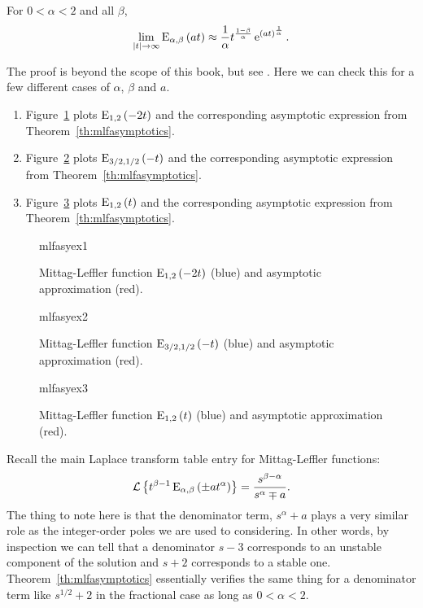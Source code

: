 \begin{theorem}
  For $0 < \alpha < 2$ and all $\beta$, 
  \begin{equation*}
    \lim_{\left| t \right| \rightarrow \infty} \operatorname{E}_{\alpha,\beta} \left( a t \right) \approx \frac{1}{\alpha} t^{\frac{1-\beta}{\alpha}}\operatorname{e}^{\left( a t \right)^\frac{1}{\alpha}}.
  \end{equation*}
  \label{th:mlfasymptotics}
\end{theorem}

The proof is beyond the scope of this book, but see \cite{fraccontrol,mlfbook}. Here we can check this for a few different cases of $\alpha$, $\beta$ and $a$.

\begin{example}
  \begin{enumerate}
    \item Figure~\ref{fig:mlfasyex1} plots $\operatorname{E}_{1,2}\left(-2 t \right)$ and the corresponding asymptotic expression from Theorem~\ref{th:mlfasymptotics}. 
    \item Figure~\ref{fig:mlfasyex2} plots $\operatorname{E}_{3/2,1/2}\left(-t \right)$ and the corresponding asymptotic expression from Theorem~\ref{th:mlfasymptotics}. 
    \item Figure~\ref{fig:mlfasyex3} plots $\operatorname{E}_{1,2}\left(t \right)$ and the corresponding asymptotic expression from Theorem~\ref{th:mlfasymptotics}. 
  \end{enumerate} 
\end{example}

\begin{figure}  
  \centering
  {mlfasyex1}
  \caption{Mittag-Leffler function $\operatorname{E}_{1,2}\left(-2 t\right)$ (blue) and asymptotic approximation (red).}
  \label{fig:mlfasyex1}
\end{figure}

\begin{figure}  
  \centering
  {mlfasyex2}
  \caption{Mittag-Leffler function $\operatorname{E}_{3/2,1/2}\left(-t\right)$ (blue) and asymptotic approximation (red).}
  \label{fig:mlfasyex2}
\end{figure}

\begin{figure}  
  \centering
  {mlfasyex3}
  \caption{Mittag-Leffler function $\operatorname{E}_{1,2}\left(t\right)$ (blue) and asymptotic approximation (red).}
  \label{fig:mlfasyex3}
\end{figure}

Recall the main Laplace transform table entry for Mittag-Leffler functions:
\begin{equation*}
  \mathcal L \left\{ t^{\beta - 1} \operatorname{E}_{\alpha,\beta} \left( \pm a t^\alpha \right) \right\} = \frac{s^{\beta-\alpha}}{s^\alpha \mp a}.
\end{equation*}
The thing to note here is that the denominator term, $s^\alpha + a$ plays a very similar role as the integer-order poles we are used to considering. In other words, by inspection we can tell that a denominator $s-3$ corresponds to an unstable component of the solution and $s+2$ corresponds to a stable one. Theorem~\ref{th:mlfasymptotics} essentially verifies the same thing for a denominator term like $s^{1/2}+2$ in the fractional case as long as $0 < \alpha < 2$.

